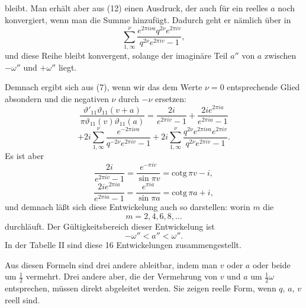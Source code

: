 bleibt. Man erhält aber aus (12) einen Ausdruck, der auch für
ein reelles $a$ noch konvergiert, wenn man die Summe
hinzufügt. Dadurch geht er nämlich über in
\[
\sum_{1,\infty}^{\nu} \frac{e^{2\pi i\nu a}q^{2\nu}e^{2\pi iv}}{q^{2\nu}e^{2\pi iv} - 1},
\]
und diese Reihe bleibt konvergent, solange der imaginäre Teil $a''$
von $a$ zwischen $-\omega''$ und $+\omega''$ liegt.

Demnach ergibt sich aus (7), wenn wir das dem Werte $\nu = 0$
entsprechende Glied absondern und die negativen $\nu$ durch $-\nu$
ersetzen:
\[
\frac{\vartheta'_{11}\vartheta_{11}(v+a)}{\pi\vartheta_{11}(v)\vartheta_{11}(a)} = \frac{2i}{e^{2\pi iv} - 1} + \frac{2ie^{2\pi ia}}{e^{2\pi ia} - 1}
\]
\[
+ 2i\sum_{1,\infty}^{\nu} \frac{e^{-2\pi i\nu a}}{q^{-2\nu}e^{2\pi iv} - 1} + 2i\sum_{1,\infty}^{\nu} \frac{q^{2\nu}e^{2\pi i\nu a}e^{2\pi iv}}{q^{2\nu}e^{2\pi iv} - 1}.
\]
Es ist aber
\[
\frac{2i}{e^{2\pi iv} - 1} = \frac{e^{-\pi iv}}{\sin\pi v} = \mathrm{cotg}\,\pi v - i,
\]
\[
\frac{2ie^{2\pi ia}}{e^{2\pi ia} - 1} = \frac{e^{\pi ia}}{\sin\pi a} = \mathrm{cotg}\,\pi a + i,
\]
und demnach läßt sich diese Entwickelung auch so darstellen:
worin $m$ die 
\[
m = 2, 4, 6, 8, \dots
\]
durchläuft. Der Gültigkeitsbereich dieser Entwickelung ist
\[
-\omega'' < a'' < \omega''.
\]
In der Tabelle II sind diese 16 Entwickelungen zusammengestellt.

Aus diesen Formeln sind drei andere ableitbar, indem man
$v$ oder $a$ oder beide um $\frac{1}{2}$ vermehrt. Drei andere aber, die der
Vermehrung von $v$ und $a$ um $\frac{1}{2}\omega$ entsprechen, müssen direkt abgeleitet
 werden. Sie zeigen reelle Form, wenn $q$, $a$, $v$ reell sind.
